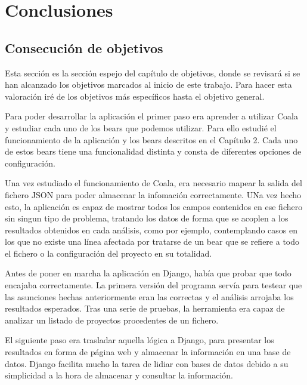\documentclass[a4paper, 12pt]{book}
\begin{document}

\cleardoublepage
\chapter{Conclusiones}
\label{chap:conclusiones}


\section{Consecución de objetivos}
\label{sec:consecucion-objetivos}

Esta sección es la sección espejo del capítulo de objetivos, donde se revisará si se han alcanzado los objetivos marcados al inicio de este trabajo. Para hacer esta valoración iré de los objetivos más específicos hasta el objetivo general.

Para poder desarrollar la aplicación el primer paso era aprender a utilizar Coala y estudiar cada uno de los bears que podemos utilizar. Para ello estudié el funcionamiento de la aplicación y los bears descritos en el Capítulo 2. Cada uno de estos bears tiene una funcionalidad distinta y consta de diferentes opciones de configuración.

Una vez estudiado el funcionamiento de Coala, era necesario mapear la salida del fichero JSON para poder almacenar la infomación correctamente. UNa vez hecho esto, la aplicación es capaz de mostrar todos los campos contenidos en ese fichero sin singun tipo de problema, tratando los datos de forma que se acoplen a los resultados obtenidos en cada análisis, como por ejemplo, contemplando casos en los que no existe una línea afectada por tratarse de un bear que se refiere a todo el fichero o la configuración del proyecto en su totalidad.

Antes de poner en marcha la aplicación en Django, había que probar que todo encajaba correctamente. La primera versión del programa servía para testear que las asunciones hechas anteriormente eran las correctas y el análisis arrojaba los resultados esperados. Tras una serie de pruebas, la herramienta era capaz de analizar un listado de proyectos procedentes de un fichero.

El siguiente paso era trasladar aquella lógica a Django, para presentar los resultados en forma de página web y almacenar la información en una base de datos. Django facilita mucho la tarea de lidiar con bases de datos debido a su simplicidad a la hora de almacenar y consultar la información.
\end{document}
